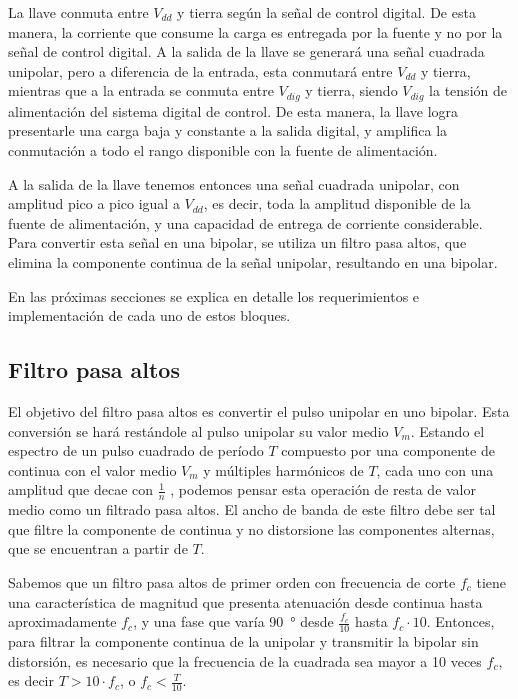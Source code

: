 La llave conmuta entre $V_{dd}$ y tierra según la señal de control digital. De
esta manera, la corriente que consume la carga es entregada por la fuente y no
por la señal de control digital. A la salida de la llave se generará una señal
cuadrada unipolar, pero a diferencia de la entrada, esta conmutará entre
$V_{dd}$ y tierra, mientras que a la entrada se conmuta entre $V_{dig}$ y
tierra, siendo $V_{dig}$ la tensión de alimentación del sistema digital de
control. De esta manera, la llave logra presentarle una carga baja y constante a
la salida digital, y amplifica la conmutación a todo el rango disponible con la
fuente de alimentación.

A la salida de la llave tenemos entonces una señal cuadrada unipolar, con
amplitud pico a pico igual a $V_{dd}$, es decir, toda la amplitud disponible de
la fuente de alimentación, y una capacidad de entrega de corriente considerable.
Para convertir esta señal en una bipolar, se utiliza un filtro pasa altos, que
elimina la componente continua de la señal unipolar, resultando en una bipolar.

En las próximas secciones se explica en detalle los requerimientos e
implementación de cada uno de estos bloques.

\subsection{Filtro pasa altos}

El objetivo del filtro pasa altos es convertir el pulso unipolar en uno bipolar.
Esta conversión se hará restándole al pulso unipolar su valor medio $V_m$.
Estando el espectro de un pulso cuadrado de período $T$ compuesto por una
componente de continua con el valor medio $V_{m}$ y múltiples harmónicos de $T$,
cada uno con una amplitud que decae con $\frac{1}{n}$ \cite{hsu1970analisis},
podemos pensar esta operación de resta de valor medio como un filtrado pasa
altos.  El ancho de banda de este filtro debe ser tal que filtre la componente
de continua y no distorsione las componentes alternas, que se encuentran a
partir de $T$.

Sabemos que un filtro pasa altos de primer orden con frecuencia de corte $f_c$
tiene una característica de magnitud que presenta atenuación desde continua hasta
aproximadamente $f_c$, y una fase que varía \qty{90}{\degree} desde
$\frac{f_c}{10}$ hasta $f_c \cdot 10$. Entonces, para filtrar la componente
continua de la unipolar y transmitir la bipolar sin distorsión,
es necesario que la frecuencia de la cuadrada sea mayor a 10 veces $f_c$, es
decir $T > 10 \cdot f_c$, o $f_c < \frac{T}{10}$.


